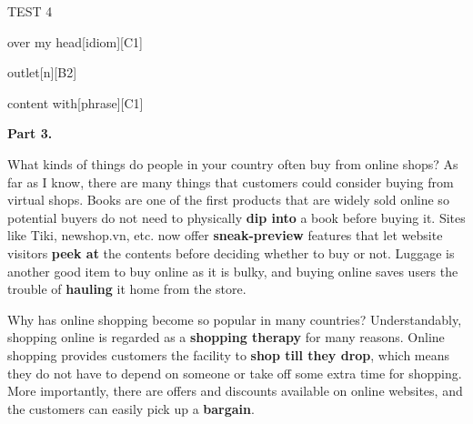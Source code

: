 \begin{glossarymc}[Cambridge 14]
\begin{test}{TEST 4}
\begin{VocabExplain}[Part 2]
            \begin{ExplainCard}{over my head}[idiom][C1]
            \end{ExplainCard}

            \begin{ExplainCard}{outlet}[n][B2]
            \end{ExplainCard}

            \begin{ExplainCard}{content with}[phrase][C1]
            \end{ExplainCard}
        \end{VocabExplain}

    \noindent
    \textbf{Part 3.}
    \begin{qa}{What kinds of things do people in your country often buy from online shops?}
    As far as I know, there are many things that customers could consider buying from virtual shops. Books are one of the first products that are widely sold online so potential buyers do not need to physically \textbf{dip into} a book before buying it. Sites like Tiki, newshop.vn, etc. now offer \textbf{sneak-preview} features that let website visitors \textbf{peek at} the contents before deciding whether to buy or not. Luggage is another good item to buy online as it is bulky, and buying online saves users the trouble of \textbf{hauling} it home from the store.
    \end{qa}

    \begin{qa}{Why has online shopping become so popular in many countries?}
    Understandably, shopping online is regarded as a \textbf{shopping therapy} for many reasons. Online shopping provides customers the facility to \textbf{shop till they drop}, which means they do not have to depend on someone or take off some extra time for shopping. More importantly, there are offers and discounts available on online websites, and the customers can easily pick up a \textbf{bargain}.
    \end{qa}


\end{test}
\end{glossarymc}

